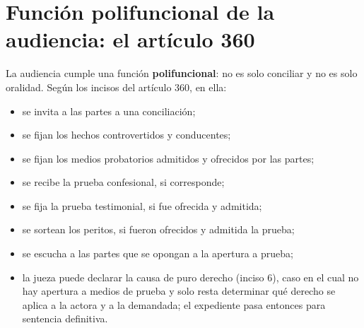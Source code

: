 \documentclass[12pt,oneside]{book}
\begin{document}
\section{Función polifuncional de la audiencia: el artículo 360}

La audiencia cumple una función \textbf{polifuncional}: no es solo conciliar y no es solo oralidad. Según los incisos del artículo 360, en ella:

\begin{itemize}
    \item se invita a las partes a una conciliación;
    \item se fijan los hechos controvertidos y conducentes;
    \item se fijan los medios probatorios admitidos y ofrecidos por las partes;
    \item se recibe la prueba confesional, si corresponde;
    \item se fija la prueba testimonial, si fue ofrecida y admitida;
    \item se sortean los peritos, si fueron ofrecidos y admitida la prueba;
    \item se escucha a las partes que se opongan a la apertura a prueba;
    \item la jueza puede declarar la causa de puro derecho (inciso 6), caso en el cual no hay apertura a medios de prueba y solo resta determinar qué derecho se aplica a la actora y a la demandada; el expediente pasa entonces para sentencia definitiva.
\end{itemize}
\end{document}
